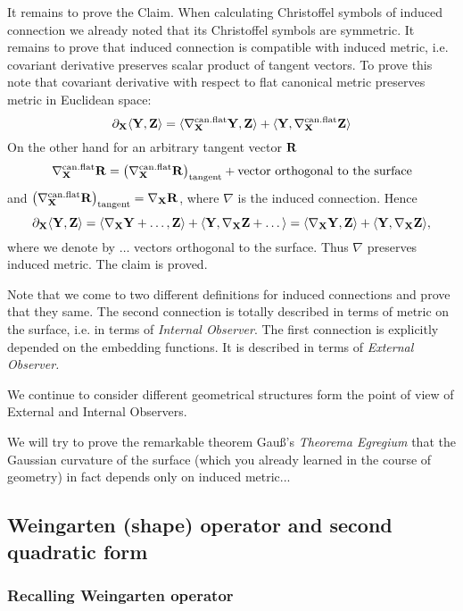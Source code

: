 \documentclass[12pt]{article}
\theoremstyle{theorem}
\numberwithin{equation}{section}
\begin{document}
{     It remains to prove the Claim.  When calculating Christoffel symbols of induced connection we already
     noted that its Christoffel symbols are symmetric. It remains to prove that induced connection is compatible
     with induced metric, i.e. covariant derivative preserves scalar product of tangent vectors.
     To prove this note that covariant derivative with respect to flat canonical metric preserves
 metric in Euclidean space:
                              $$
    \partial_{\bf X}\langle {\bf Y},{\bf Z}\rangle=\langle \nabla^{\rm can.flat}_{\bf X}{\bf Y},{\bf Z}\rangle+\langle {\bf Y},\nabla^{\rm can.flat}_{\bf X}{\bf Z}\rangle
                              $$
                 On the other hand for an arbitrary tangent vector ${\bf R}$
                 $$
   \nabla^{\rm can.flat}_{\bf X} {\bf R}= \left(\nabla^{\rm can.flat}_{\bf X} {\bf R}\right)_{\rm tangent}+\hbox {vector orthogonal to the surface}
                $$
    and $\left(\nabla^{\rm can.flat}_{\bf X} {\bf R}\right)_{\rm tangent}=\nabla_{\bf X}{\bf R}$, where $\nabla$ is the induced connection. Hence
                             $$
     \partial_{\bf X}\langle {\bf Y},{\bf Z}\rangle=\langle \nabla_{\bf X}{\bf Y}+\dots,{\bf Z}\rangle+\langle {\bf Y},\nabla_{\bf X}{\bf Z}+\dots\rangle=
     \langle \nabla_{\bf X}{\bf Y},{\bf Z}\rangle+\langle {\bf Y},\nabla_{\bf X}{\bf Z}\rangle,
                             $$
 where we denote by $\dots$ vectors orthogonal to the surface.  Thus
 $\nabla$ preserves induced metric. The claim is proved.


 Note that we come to two different definitions for induced connections and prove that they same.
 The second connection is totally described in terms of metric on the surface, i.e. in terms of {\it Internal Observer}.
  The first connection
 is explicitly depended on the embedding functions. It is described in terms of {\it External Observer.}

 We continue to consider different geometrical structures form the point of view of External and Internal Observers.

 We will try to prove the remarkable theorem Gau\ss's {\it Theorema Egregium} that the Gaussian  curvature
 of the surface (which you already learned in the course of geometry)  in fact depends only on induced metric...

 \subsection {Weingarten (shape) operator and second quadratic form}

   \subsubsection {Recalling Weingarten operator}

}
\end{document}
